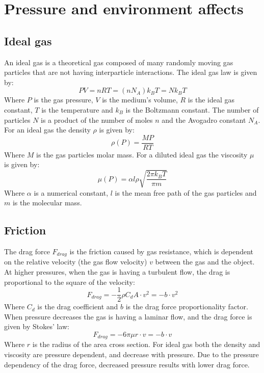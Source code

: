 \documentclass[\main/master.tex]{subfiles}
\begin{document}
\section{Pressure and environment affects}
\subsection{Ideal gas}
An ideal gas is a theoretical gas composed of many randomly moving gas particles that are not having interparticle interactions. The ideal gas law is given by:
\begin{equation}
PV = nRT = (n N_A) k_B T = N k_B T  \label{eqn:ideal-gasses}
\end{equation}
Where $P$ is the gas pressure, $V$ is the medium's volume, $R$ is the ideal gas constant, $T$ is the temperature and $k_B$ is the Boltzmann constant. The number of particles $N$ is a product of the number of moles $n$ and the Avogadro constant $N_A$. For an ideal gas the density $\rho$ is given by:
\begin{equation}
\rho(P) = \frac{MP}{RT}     \label{eqn:ideal density}
\end{equation}
Where $M$ is the gas particles molar mass. For a diluted ideal gas the viscosity $\mu$ is given by:
\begin{equation}
\mu(P) = \alpha l \rho \sqrt{\frac{2\pi k_B  T}{\pi m}}      \label{eqn:viscosity}
\end{equation}
Where $\alpha$ is a numerical constant, $l$ is the mean free path of the gas particles and $m$ is the molecular mass. 

\subsection{Friction}
The drag force $F_{drag}$ is the friction caused by gas resistance, which is dependent on the relative velocity (the gas flow velocity) $v$ between the gas and the object. At higher pressures, when the gas is having a turbulent flow, the drag is proportional to the square of the velocity:
\begin{equation}
F_{drag} = -\frac{1}{2}\rho C_d A \cdot v^2 = -b\cdot v^2 
\label{eqn:drag force}
\end{equation}
Where $C_d$ is the drag coefficient and $b$ is the drag force proportionality factor. When pressure decreases the gas is having a laminar flow, and the drag force is given by Stokes' law:
\begin{equation}
F_{drag} = -6\pi\mu r\cdot v = -b\cdot v
\label{eqn:drag force}
\end{equation}
Where $r$ is the radius of the area cross section. For ideal gas both the density and viscosity are pressure dependent, and decrease with pressure. Due to the pressure dependency of the drag force, decreased pressure results with lower drag force.
\end{document}
